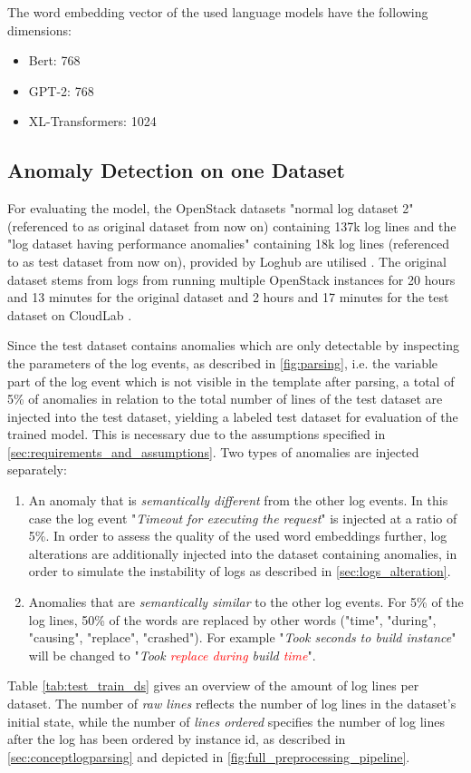 \noindent The word embedding vector of the used language models have the following dimensions:
\begin{itemize}
	\item Bert: 768 
	\item GPT-2: 768
	\item XL-Transformers: 1024
\end{itemize}

\subsection{Anomaly Detection on one Dataset \label{sec:ad_one_ds_result}}
For evaluating the model, the OpenStack datasets "normal log dataset 2" (referenced to as original dataset from now on) containing 137k log lines and the "log dataset having performance anomalies" containing 18k log lines (referenced to as test dataset from now on), provided by Loghub are utilised \cite{utah_dataset}. The original dataset stems from logs from running multiple OpenStack instances for 20 hours and 13 minutes for the original dataset and 2 hours and 17 minutes for the test dataset on CloudLab \cite{cloudlab}. 

Since the test dataset contains anomalies which are only detectable by inspecting the parameters of the log events, as described in \ref{fig:parsing}, i.e. the variable part of the log event which is not visible in the template after parsing, a total of 5\% of anomalies in relation to the total number of lines of the test dataset are injected into the test dataset, yielding a labeled test dataset for evaluation of the trained model. This is necessary due to the assumptions specified in \ref{sec:requirements_and_assumptions}. Two types of anomalies are injected separately:
\begin{enumerate}
	\item An anomaly that is \textit{semantically different} from the other log events. In this case the log event "\textit{Timeout for executing the request}" is injected at a ratio of 5\%. In order to assess the quality of the used word embeddings further, log alterations are additionally injected into the dataset containing anomalies, in order to simulate the instability of logs as described in \ref{sec:logs_alteration}.
	\item Anomalies that are \textit{semantically similar} to the other log events. For 5\% of the log lines, 50\% of the words are replaced by other words ("time", "during", "causing", "replace", "crashed"). For example "\textit{Took seconds to build instance}" will be changed to "\textit{Took \textcolor{red}{replace} \textcolor{red}{during} build \textcolor{red}{time}}".
\end{enumerate}
Table \ref{tab:test_train_ds} gives an overview of the amount of log lines per dataset. The number of \textit{raw lines} reflects the number of log lines in the dataset's initial state, while the number of \textit{lines ordered} specifies the number of log lines after the log has been ordered by instance id, as described in \ref{sec:conceptlogparsing} and depicted in \ref{fig:full_preprocessing_pipeline}.


